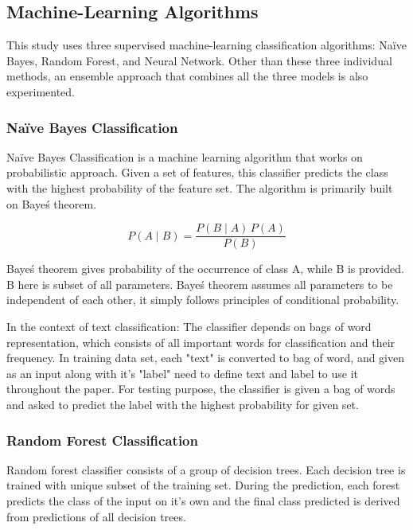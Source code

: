 \documentclass[12pt]{article}
\begin{document}
\subsection{Machine-Learning Algorithms}

This study uses three supervised machine-learning classification algorithms: Na\"ive Bayes, Random Forest, and Neural Network. Other than these three individual methods, an ensemble approach that combines all the three models is also experimented. 

\subsubsection{Na\"ive Bayes Classification}

Na\"ive Bayes Classification is a machine learning algorithm that works on probabilistic approach. Given a set of features, this classifier predicts the class with the highest probability of the feature set. The algorithm is primarily built on Baye\'s theorem.

$$ P(A \mid B) = \frac{P(B \mid A) \, P(A)}{P(B)} $$

Baye\'s theorem gives probability of the occurrence of class A, while B is provided. B here is subset of all parameters. Baye\'s theorem assumes all parameters to be independent of each other, it simply follows principles of conditional probability.

In the context of text classification: The classifier depends on bags of word representation, which consists of all important words for classification and their frequency. In training data set, each "text" is converted to bag of word, and given as an input along with it's "label" {need to define text and label to use it throughout the paper}. For testing purpose, the classifier is given a bag of words and asked to predict the label with the highest probability for given set.

\subsubsection{Random Forest Classification}

Random forest classifier consists of a group of decision trees. Each decision tree is trained with unique subset of the training set. During the prediction, each forest predicts the class of the input on it's own and the final class predicted is derived from predictions of all decision trees.
\end{document}
